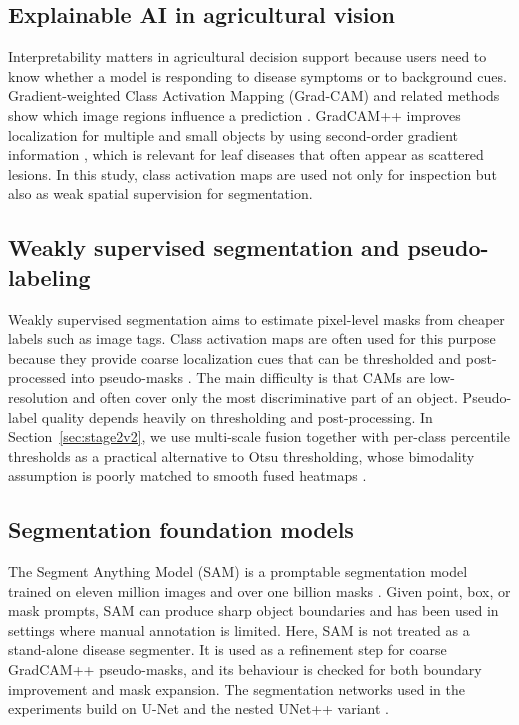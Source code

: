 \documentclass[final,5p,times,twocolumn,authoryear]{elsarticle}
\begin{document}
\subsection{Explainable AI in agricultural vision}

Interpretability matters in agricultural decision support because users need to know whether a model is responding to disease symptoms or to background cues. Gradient-weighted Class Activation Mapping (Grad-CAM) and related methods show which image regions influence a prediction \citep{selvaraju2017grad}. GradCAM++ improves localization for multiple and small objects by using second-order gradient information \citep{chattopadhay2018grad}, which is relevant for leaf diseases that often appear as scattered lesions. In this study, class activation maps are used not only for inspection but also as weak spatial supervision for segmentation.

\subsection{Weakly supervised segmentation and pseudo-labeling}

Weakly supervised segmentation aims to estimate pixel-level masks from cheaper labels such as image tags. Class activation maps are often used for this purpose because they provide coarse localization cues that can be thresholded and post-processed into pseudo-masks \citep{barbedo2019plant}. The main difficulty is that CAMs are low-resolution and often cover only the most discriminative part of an object. Pseudo-label quality depends heavily on thresholding and post-processing. In Section~\ref{sec:stage2v2}, we use multi-scale fusion together with per-class percentile thresholds as a practical alternative to Otsu thresholding, whose bimodality assumption is poorly matched to smooth fused heatmaps \citep{otsu1979threshold}.

\subsection{Segmentation foundation models}

The Segment Anything Model (SAM) is a promptable segmentation model trained on eleven million images and over one billion masks \citep{kirillov2023segment}. Given point, box, or mask prompts, SAM can produce sharp object boundaries and has been used in settings where manual annotation is limited. Here, SAM is not treated as a stand-alone disease segmenter. It is used as a refinement step for coarse GradCAM++ pseudo-masks, and its behaviour is checked for both boundary improvement and mask expansion. The segmentation networks used in the experiments build on U-Net \citep{ronneberger2015unet} and the nested UNet++ variant \citep{zhou2018unet++}.
\end{document}
